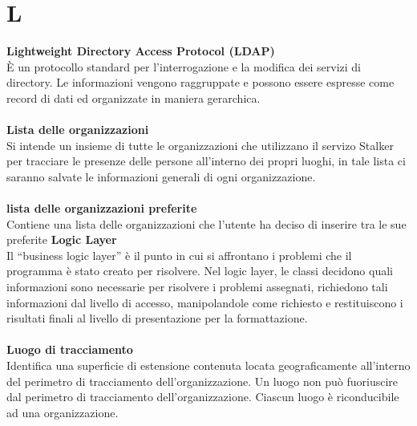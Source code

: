 \section{L}
\textbf{Lightweight Directory Access Protocol (LDAP)}\\
È un protocollo standard per l'interrogazione e la modifica dei servizi di directory. Le informazioni vengono raggruppate e possono essere espresse come record di dati ed organizzate in maniera gerarchica. \\ \\
\textbf{Lista delle organizzazioni}\\
Si intende un insieme di tutte le organizzazioni che utilizzano il servizo Stalker per tracciare le presenze delle persone all’interno dei propri luoghi, in tale lista ci saranno salvate le informazioni generali di ogni organizzazione.\\ \\
\textbf{lista delle organizzazioni preferite}\\
Contiene una lista delle organizzazioni che l'utente ha deciso di inserire tra le sue preferite
\textbf{Logic Layer}\\
Il “business logic layer” è il punto in cui si affrontano i problemi che il programma è stato creato per risolvere. Nel logic layer, le classi decidono quali informazioni sono necessarie per risolvere i problemi assegnati, richiedono tali informazioni dal livello di accesso, manipolandole come richiesto e restituiscono i risultati finali al livello di presentazione per la formattazione. \\ \\
\textbf{Luogo di tracciamento}\\
Identifica una superficie di estensione contenuta locata geograficamente all'interno del perimetro di tracciamento dell'organizzazione. Un luogo non può fuoriuscire dal perimetro di tracciamento dell'organizzazione. Ciascun luogo è riconducibile ad una organizzazione.\\ \\
\clearpage